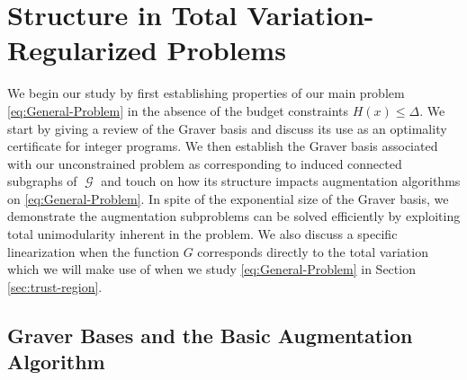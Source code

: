 \documentclass[pdflatex,sn-mathphys-num]{sn-jnl}%
\newcommand{\R}{\mathbb{R}} %
\newcommand{\Z}{\mathbb{Z}} %
\DeclareMathOperator{\Gcal}{\mathcal{G}}
\begin{document}
\section{Structure in Total Variation-Regularized Problems}\label{sec:structure}

We begin our study by first establishing properties of our main problem \eqref{eq:General-Problem} in the absence of the budget constraints $H(x) \le \Delta$. We start by giving a review of the Graver basis and discuss its use as an optimality certificate for integer programs. We then establish the Graver basis associated with our unconstrained problem as corresponding to induced connected subgraphs of $\Gcal$ and touch on how its structure impacts augmentation algorithms on \eqref{eq:General-Problem}. In spite of the exponential size of the Graver basis, we demonstrate the augmentation subproblems can be solved efficiently by exploiting total unimodularity inherent in the problem.  We also discuss a specific linearization when the function $G$ corresponds directly to the total variation which we will make use of when we study \eqref{eq:General-Problem} in Section \ref{sec:trust-region}.



\subsection{Graver Bases and the Basic Augmentation Algorithm}



\end{document}
